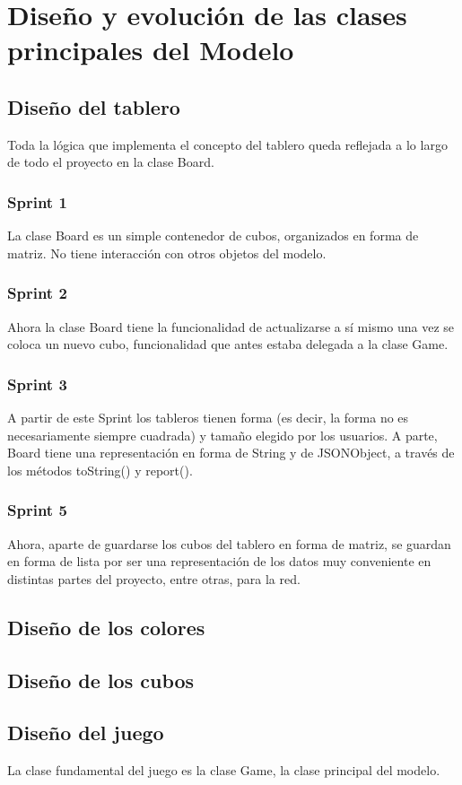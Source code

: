 \documentclass{article}
\theoremstyle{break}
\begin{document}
\graphicspath{{./fotos/}}
\section{Diseño y evolución de las clases principales del Modelo}
\subsection{Diseño del tablero}
Toda la lógica que implementa el concepto del tablero queda reflejada a lo largo de todo el proyecto en la clase Board.
\subsubsection{Sprint 1}
La clase Board es un simple contenedor de cubos, organizados en forma de matriz.
No tiene interacción con otros objetos del modelo.
\subsubsection{Sprint 2}
Ahora la clase Board tiene la funcionalidad de actualizarse a sí mismo una vez se coloca un nuevo cubo, funcionalidad que antes estaba delegada a la clase Game.
\subsubsection{Sprint 3}
A partir de este Sprint los tableros tienen forma (es decir, la forma no es necesariamente siempre cuadrada) y tamaño elegido por los usuarios. A parte, Board tiene una representación en forma de String y de JSONObject, a través de los métodos toString() y report().
\subsubsection{Sprint 5}
Ahora, aparte de guardarse los cubos del tablero en forma de matriz, se guardan en forma de lista por ser una representación de los datos muy conveniente en distintas partes del proyecto, entre otras, para la red.

\subsection{Diseño de los colores}

\subsection{Diseño de los cubos}

\subsection{Diseño del juego}
La clase fundamental del juego es la clase Game, la clase principal del modelo.
\end{document}
